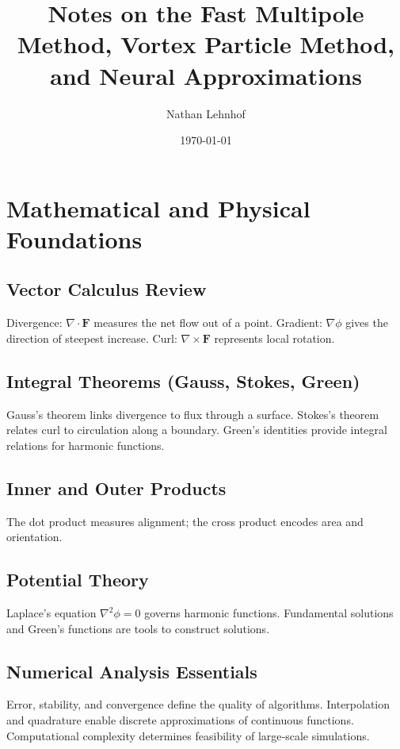 \documentclass[conf]{new-aiaa} %
\begin{document}
\sloppy %

\title{Notes on the Fast Multipole Method, Vortex Particle Method, and Neural Approximations}
\author{Nathan Lehnhof}
\date{\today}
\maketitle

\tableofcontents

\section{Mathematical and Physical Foundations}

\subsection{Vector Calculus Review}
Divergence: $\nabla \cdot \mathbf{F}$ measures the net flow out of a point.  
Gradient: $\nabla \phi$ gives the direction of steepest increase.  
Curl: $\nabla \times \mathbf{F}$ represents local rotation.

\subsection{Integral Theorems (Gauss, Stokes, Green)}
Gauss's theorem links divergence to flux through a surface.  
Stokes's theorem relates curl to circulation along a boundary.  
Green's identities provide integral relations for harmonic functions.

\subsection{Inner and Outer Products}
The dot product measures alignment; the cross product encodes area and orientation.

\subsection{Potential Theory}
Laplace’s equation $\nabla^2 \phi = 0$ governs harmonic functions.  
Fundamental solutions and Green’s functions are tools to construct solutions.

\subsection{Numerical Analysis Essentials}
Error, stability, and convergence define the quality of algorithms.  
Interpolation and quadrature enable discrete approximations of continuous functions.  
Computational complexity determines feasibility of large‐scale simulations.
\end{document}
